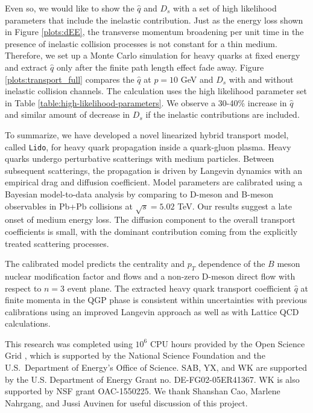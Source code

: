 \documentclass[aps, prc, reprint, amsmath, groupedaddress, nofootinbib]{revtex4-1}
\begin{document}
Even so, we would like to show the $\hat{q}$ and $D_s$ with a set of high likelihood parameters that include the inelastic contribution.
Just as the energy loss shown in Figure \ref{plots:dEE}, the transverse momentum broadening per unit time in the presence of inelastic collision processes is not constant for a thin medium.
Therefore, we set up a Monte Carlo simulation for heavy quarks at fixed energy  and extract $\hat{q}$ only after the finite path length effect fade away. 
Figure \ref{plots:transport_full} compares the $\hat{q}$ at $p=10$ GeV and $D_s$ with and without inelastic collision channels.
The calculation uses the high likelihood parameter set in Table \ref{table:high-likelihood-parameters}. 
We observe a 30-40\% increase in $\hat{q}$ and similar amount of decrease in $D_s$ if the inelastic contributions are included.

To summarize, we have developed a novel linearized hybrid transport model, called {\tt Lido}, for heavy quark propagation inside a quark-gluon plasma.
Heavy quarks undergo perturbative scatterings with medium particles. Between subsequent scatterings, the propagation is driven by Langevin dynamics with an empirical drag and diffusion coefficient.
Model parameters are calibrated using a Bayesian model-to-data analysis by comparing to D-meson and B-meson observables in Pb+Pb collisions at $\sqrt{s}=5.02$ TeV.
Our results suggest a late onset of medium energy loss.
The diffusion component to the overall transport coefficients is small, with the dominant contribution coming from the explicitly treated scattering processes.

The calibrated model predicts the centrality and $p_T$ dependence of the $B$ meson nuclear modification factor and flows and a non-zero D-meson direct flow with respect to $n=3$ event plane.
The extracted heavy quark transport coefficient $\hat{q}$ at finite momenta in the QGP phase is consistent within uncertainties with previous calibrations using an improved Langevin approach as well as with Lattice QCD calculations.

\begin{acknowledgments}
  This research was completed using $10^6$ CPU hours provided by the Open Science Grid \cite{Pordes:2007zzb,Sfiligoi:2010zz}, which is supported by the National Science Foundation and the U.S.\ Department of Energy's Office of Science.
SAB, YX, and WK  are supported by the U.S. Department of Energy Grant no. DE-FG02-05ER41367.
 WK is also supported by NSF grant OAC-1550225.
We thank Shanshan Cao, Marlene Nahrgang, and Jussi Auvinen for useful discussion of this project.
\end{acknowledgments}
\end{document}
